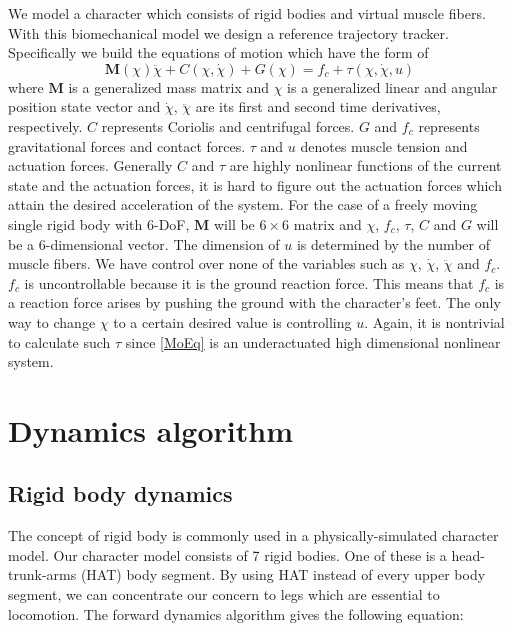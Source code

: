 \documentclass[a4paper,10pt]{article}
\begin{document}
We model a character which consists of rigid bodies and virtual muscle fibers.
With this biomechanical model we design a reference trajectory tracker.
Specifically we build the equations of motion which have the
form of
\begin{equation}\label{MoEq}
\mathbf{M}(\chi)\ddot\chi + C(\chi,\dot\chi) + G(\chi ) = f_c + \tau (\chi, \dot\chi, u)
\end{equation}
where $\mathbf{M}$ is a generalized mass matrix and $\chi$ is a generalized
linear and angular position
state vector and $\dot\chi$, $\ddot\chi$ are its first and second time derivatives,
respectively. $C$ represents Coriolis and centrifugal forces.
$G$ and $f_c$ represents gravitational forces and contact forces.
$\tau$ and $u$ denotes muscle tension and actuation forces.
Generally $C$ and $\tau$ are highly nonlinear functions of the current state and the
actuation forces, it is hard to figure out the actuation forces which attain
the desired acceleration of the system.
For the case of a freely moving single
rigid body with 6-DoF, $\mathbf{M}$ will be $6\times 6$ matrix and $\chi$,
$f_c$, $\tau$, $C$ and $G$ will be a 6-dimensional vector. The dimension of $u$ is
determined by the number of muscle fibers. We have control
over none of the variables such as $\chi$, $\dot\chi$, $\ddot\chi$ and $f_c$.
$f_c$ is uncontrollable because it is the ground reaction force. This means that
$f_c$ is a reaction force arises by pushing the ground with the character's feet.
The only way to change $\chi$ to a certain desired value is controlling $u$.
Again, it is nontrivial to calculate such $\tau$ since \eqref{MoEq}
is an underactuated high dimensional nonlinear system.

\pagebreak

\section{Dynamics algorithm}

\subsection{Rigid body dynamics}

The concept of rigid body is commonly used in a physically-simulated
character model.
Our character model consists of 7 rigid bodies. One of these is
a head-trunk-arms (HAT) body segment. By using HAT instead of every upper body
segment, we can concentrate our concern to legs which are essential to
locomotion. The forward dynamics algorithm gives the following equation:
\end{document}
